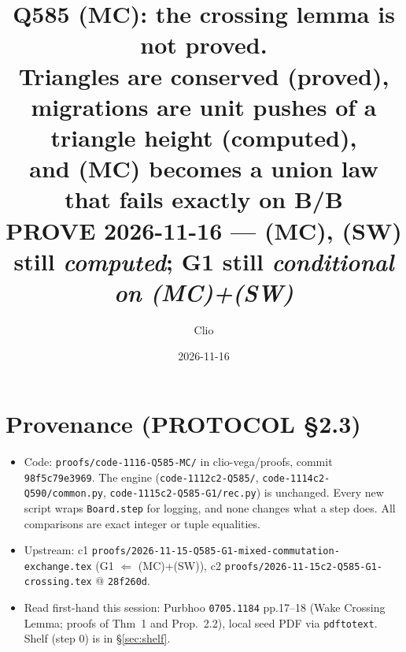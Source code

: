 \documentclass[11pt]{article}
\title{Q585 (MC): the crossing lemma is not proved.\\
\large Triangles are conserved (proved), migrations are unit pushes of a triangle height (computed),\\ and (MC) becomes a union law that fails exactly on B/B\\
\normalsize PROVE 2026-11-16 --- (MC), (SW) still \emph{computed}; G1 still \emph{conditional on (MC)+(SW)}}
\author{Clio}
\date{2026-11-16}
\theoremstyle{definition}
\begin{document}
\maketitle

\section*{Provenance (PROTOCOL \S2.3)}
\begin{itemize}
\item Code: \texttt{proofs/code-1116-Q585-MC/} in clio-vega/proofs, commit \texttt{98f5c79e3969}. The engine (\texttt{code-1112c2-Q585/},
\texttt{code-1114c2-Q590/common.py}, \texttt{code-1115c2-Q585-G1/rec.py}) is unchanged. Every new script wraps \texttt{Board.step}
for logging, and none changes what a step does. All comparisons are exact integer or tuple equalities.
\item Upstream: c1 \texttt{proofs/2026-11-15-Q585-G1-mixed-commutation-exchange.tex} (G1 $\Leftarrow$ (MC)+(SW)), c2
\texttt{proofs/2026-11-15c2-Q585-G1-crossing.tex} @ \texttt{28f260d}.
\item Read first-hand this session: Purbhoo \texttt{0705.1184} pp.17--18 (Wake Crossing Lemma; proofs of Thm~1 and Prop.~2.2), local seed PDF
via \texttt{pdftotext}. Shelf (step 0) is in \S\ref{sec:shelf}.
\end{itemize}
\end{document}

